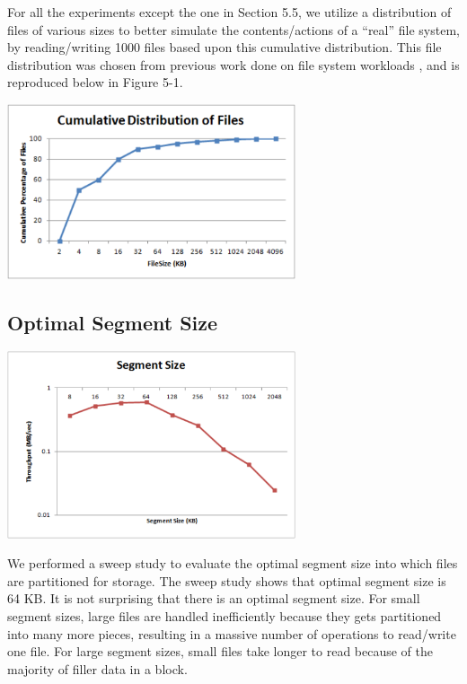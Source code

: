\documentclass[conference]{IEEEtran}
\begin{document}
For all the experiments except the one in Section 5.5, we utilize a distribution of files of various sizes to better simulate the contents/actions of a “real” file system, by reading/writing 1000 files based upon this cumulative distribution. This file distribution was chosen from previous work done on file system workloads \cite{roselli2000comparison}, and is reproduced below in Figure 5-1.

\begin{center}
\noindent\includegraphics[width=8.5cm]{510.png}
\end{center}

\subsection{Optimal Segment Size}
\begin{center}
\noindent\includegraphics[width=8.5cm]{520.png}
\end{center}

We performed a sweep study to evaluate the optimal segment size into which files are partitioned for storage. The sweep study shows that optimal segment size is 64 KB. It is not surprising that there is an optimal segment size. For small segment sizes, large files are handled inefficiently because they gets partitioned into many more pieces, resulting in a massive number of operations to read/write one file. For large segment sizes, small files take longer to read because of the majority of filler data in a block.
\end{document}
